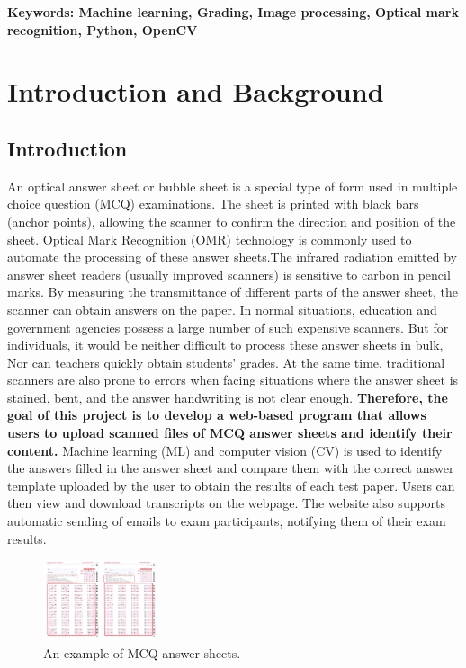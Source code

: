 \documentclass[twocolumn]{article}
\begin{document}
\begin{center}
    \textbf{Keywords: Machine learning, Grading, Image processing, Optical mark recognition, Python, OpenCV}
\end{center}


\newpage
\tableofcontents
\newpage

\twocolumn
\section{Introduction and Background}
    \subsection{Introduction}
        An optical answer sheet or bubble sheet is a special type of form used in multiple choice question (MCQ) examinations. The sheet is printed with black bars (anchor points), allowing the scanner to confirm the direction and position of the sheet\cite{OMR_def}. Optical Mark Recognition (OMR) technology is commonly used to automate the processing of these answer sheets.The infrared radiation emitted by answer sheet readers (usually improved scanners) is sensitive to carbon in pencil marks. By measuring the transmittance of different parts of the answer sheet, the scanner can obtain answers on the paper\cite{OMR_wiki}. In normal situations, education and government agencies possess a large number of such expensive scanners. But for individuals, it would be neither difficult to process these answer sheets in bulk, Nor can teachers quickly obtain students' grades. At the same time, traditional scanners are also prone to errors when facing situations where the answer sheet is stained, bent, and the answer handwriting is not clear enough. \textbf{Therefore, the goal of this project is to develop a web-based program that allows users to upload scanned files of MCQ answer sheets and identify their content.} Machine learning (ML) and computer vision (CV) is used to identify the answers filled in the answer sheet and compare them with the correct answer template uploaded by the user to obtain the results of each test paper. Users can then view and download transcripts on the webpage. The website also supports automatic sending of emails to exam participants, notifying them of their exam results.

        \begin{figure}[h]
            \centering
            \includegraphics[width=0.3\textwidth]{ans_sheet.png}
            \caption{An example of MCQ answer sheets.}
            \label{fig:ans_sheet}
        \end{figure}
\end{document}
